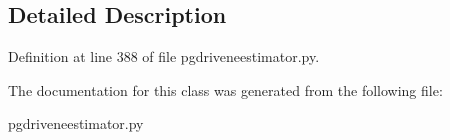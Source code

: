 \subsection{Detailed Description}


Definition at line 388 of file pgdriveneestimator.\+py.



The documentation for this class was generated from the following file\+:\begin{DoxyCompactItemize}
\item 
pgdriveneestimator.\+py\end{DoxyCompactItemize}
